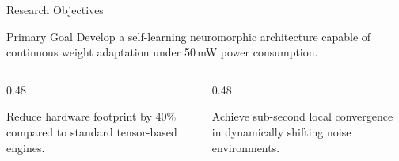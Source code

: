 \begin{frame}{Research Objectives}
  \begin{block}{Primary Goal}
    Develop a self-learning neuromorphic architecture capable of continuous weight adaptation under 50\,mW power consumption.
  \end{block}

  \begin{columns}[onlytextwidth]
    \begin{column}{0.48\textwidth}
      \begin{tcolorbox}[colback=blue!5, colframe=SynapseBlue, title=Efficiency Objective]
        Reduce hardware footprint by 40\% compared to standard tensor-based engines.
      \end{tcolorbox}
    \end{column}
    \hfill
    \begin{column}{0.48\textwidth}
      \begin{tcolorbox}[colback=teal!5, colframe=SynapseTeal, title=Adaptability Objective]
        Achieve sub-second local convergence in dynamically shifting noise environments.
      \end{tcolorbox}
    \end{column}
  \end{columns}
\end{frame}

